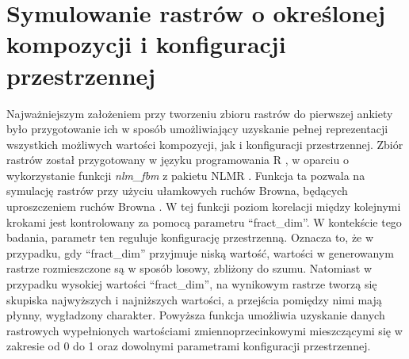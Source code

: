\documentclass{amuthesis}
\begin{document}
\hypertarget{symulowanie-rastruxf3w-o-okreux15blonej-kompozycji-i-konfiguracji-przestrzennej}{%
\section{Symulowanie rastrów o określonej kompozycji i konfiguracji
przestrzennej}\label{symulowanie-rastruxf3w-o-okreux15blonej-kompozycji-i-konfiguracji-przestrzennej}}

Najważniejszym założeniem przy tworzeniu zbioru rastrów do pierwszej
ankiety było przygotowanie ich w sposób umożliwiający uzyskanie pełnej
reprezentacji wszystkich możliwych wartości kompozycji, jak i
konfiguracji przestrzennej. Zbiór rastrów został przygotowany w języku
programowania R \autocite{R2023}, w oparciu o wykorzystanie funkcji
\emph{nlm\_fbm} z pakietu NLMR \autocite{NLMR2018}. Funkcja ta pozwala
na symulację rastrów przy użyciu ułamkowych ruchów Browna, będących
uproszczeniem ruchów Browna \autocite{nlm_fbm}. W tej funkcji poziom
korelacji między kolejnymi krokami jest kontrolowany za pomocą parametru
``fract\_dim''. W kontekście tego badania, parametr ten reguluje
konfigurację przestrzenną. Oznacza to, że w przypadku, gdy
``fract\_dim'' przyjmuje niską wartość, wartości w generowanym rastrze
rozmieszczone są w sposób losowy, zbliżony do szumu. Natomiast w
przypadku wysokiej wartości ``fract\_dim'', na wynikowym rastrze tworzą
się skupiska najwyższych i najniższych wartości, a przejścia pomiędzy
nimi mają płynny, wygładzony charakter. Powyższa funkcja umożliwia
uzyskanie danych rastrowych wypełnionych wartościami
zmiennoprzecinkowymi mieszczącymi się w zakresie od 0 do 1 oraz
dowolnymi parametrami konfiguracji przestrzennej.

\begin{Shaded}
\begin{Highlighting}[]

\OtherTok{=} \NormalTok{(}\NormalTok{, }\NormalTok{, } \NormalTok{)}
\OtherTok{=} \NormalTok{(}\NormalTok{, }\NormalTok{, } \NormalTok{)}

\OtherTok{=}\SpecialCharTok{::}
\OtherTok{=} \NormalTok{(}\NormalTok{, }\NormalTok{)}

\end{Highlighting}
\end{Shaded}
\end{document}
